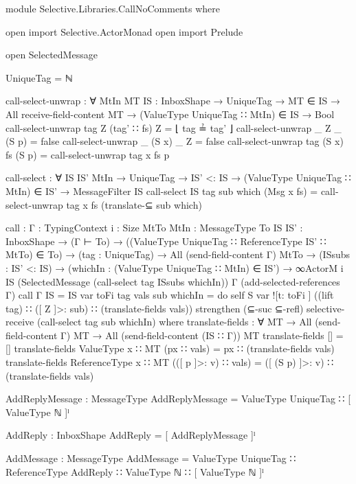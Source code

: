 \begin{code}
module Selective.Libraries.CallNoComments where

open import Selective.ActorMonad
open import Prelude

open SelectedMessage

UniqueTag = ℕ

call-select-unwrap : ∀ {MtIn MT} {IS : InboxShape} →
                        UniqueTag →
                        MT ∈ IS →
                        All receive-field-content MT →
                        (ValueType UniqueTag ∷ MtIn) ∈ IS →
                        Bool
call-select-unwrap tag Z (tag' ∷ fs) Z = ⌊ tag ≟ tag' ⌋
call-select-unwrap _ Z _ (S p) = false
call-select-unwrap _ (S x) _ Z = false
call-select-unwrap tag (S x) fs (S p) = call-select-unwrap tag x fs p

call-select : ∀ {IS IS' MtIn} →
                UniqueTag →
                IS' <: IS →
                (ValueType UniqueTag ∷ MtIn) ∈ IS' →
                MessageFilter IS
call-select {IS} tag sub which (Msg x fs) =
  call-select-unwrap tag x fs (translate-⊆  sub which)

call : {Γ : TypingContext} {i : Size}
        {MtTo MtIn : MessageType}
        {To IS IS' : InboxShape} →
        (Γ ⊢ To) →
        ((ValueType UniqueTag ∷ ReferenceType IS' ∷ MtTo) ∈ To) →
        (tag : UniqueTag) →
        All (send-field-content Γ) MtTo →
        (ISsubs : IS' <: IS) →
        (whichIn : (ValueType UniqueTag ∷ MtIn) ∈ IS') →
        ∞ActorM i IS
          (SelectedMessage (call-select tag ISsubs whichIn))
          Γ (add-selected-references Γ)
call {Γ} {IS = IS} var toFi tag vals sub whichIn =
  do
      self
      S var ![t: toFi ] ((lift tag) ∷ ([ Z ]>: sub) ∷ (translate-fields vals))
      strengthen (⊆-suc ⊆-refl)
      selective-receive (call-select tag sub whichIn)
  where
    translate-fields : ∀ {MT} →
                        All (send-field-content Γ) MT →
                        All (send-field-content (IS ∷ Γ)) MT
    translate-fields [] = []
    translate-fields {ValueType x ∷ MT} (px ∷ vals) =
      px ∷ (translate-fields vals)
    translate-fields {ReferenceType x ∷ MT} (([ p ]>: v) ∷ vals) =
      ([ (S p) ]>: v) ∷ (translate-fields vals)

AddReplyMessage : MessageType
AddReplyMessage = ValueType UniqueTag ∷ [ ValueType ℕ ]ˡ

AddReply : InboxShape
AddReply = [ AddReplyMessage ]ˡ

AddMessage : MessageType
AddMessage = ValueType UniqueTag ∷ ReferenceType AddReply ∷ ValueType ℕ ∷ [ ValueType ℕ ]ˡ


\end{code}

